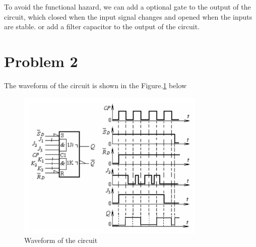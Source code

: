 \documentclass{article}
\begin{document}
To avoid the functional hazard, we can add a optional gate to the output of the circuit, which closed when the input signal changes and opened when the inputs are stable. or add a filter capacitor to the output of the circuit.


\section{Problem 2}

The waveform of the circuit is shown in the Figure.\ref{fig:waveform} below
\begin{figure}
    \centering
    \includegraphics[width=0.8\textwidth]{./image/waveform.jpg}
    \caption{Waveform of the circuit}
    \label{fig:waveform}
\end{figure}
\end{document}
